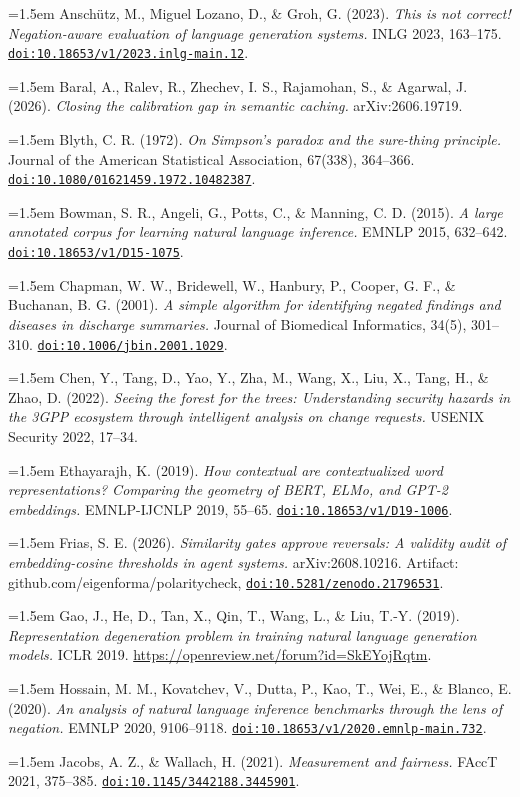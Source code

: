 \documentclass[11pt]{article}
\newcommand{\bibentry}[1]{\par\noindent\hangindent=1.5em\hangafter=1 #1\par\vspace{2pt}}
\newcommand{\doilink}[1]{\href{https://doi.org/#1}{\nolinkurl{doi:#1}}}
\begin{document}
\bibentry{\hypertarget{bib:anschutz}{}Ansch\"utz, M., Miguel Lozano, D., \& Groh, G. (2023). \emph{This is not correct! Negation-aware evaluation of language generation systems.} INLG 2023, 163--175. \doilink{10.18653/v1/2023.inlg-main.12}.}
\bibentry{\hypertarget{bib:baral}{}Baral, A., Ralev, R., Zhechev, I. S., Rajamohan, S., \& Agarwal, J. (2026). \emph{Closing the calibration gap in semantic caching.} arXiv:2606.19719.}
\bibentry{\hypertarget{bib:blyth}{}Blyth, C. R. (1972). \emph{On Simpson's paradox and the sure-thing principle.} Journal of the American Statistical Association, 67(338), 364--366. \doilink{10.1080/01621459.1972.10482387}.}
\bibentry{\hypertarget{bib:bowman}{}Bowman, S. R., Angeli, G., Potts, C., \& Manning, C. D. (2015). \emph{A large annotated corpus for learning natural language inference.} EMNLP 2015, 632--642. \doilink{10.18653/v1/D15-1075}.}
\bibentry{\hypertarget{bib:chapman}{}Chapman, W. W., Bridewell, W., Hanbury, P., Cooper, G. F., \& Buchanan, B. G. (2001). \emph{A simple algorithm for identifying negated findings and diseases in discharge summaries.} Journal of Biomedical Informatics, 34(5), 301--310. \doilink{10.1006/jbin.2001.1029}.}
\bibentry{\hypertarget{bib:chen}{}Chen, Y., Tang, D., Yao, Y., Zha, M., Wang, X., Liu, X., Tang, H., \& Zhao, D. (2022). \emph{Seeing the forest for the trees: Understanding security hazards in the 3GPP ecosystem through intelligent analysis on change requests.} USENIX Security 2022, 17--34.}
\bibentry{\hypertarget{bib:ethayarajh}{}Ethayarajh, K. (2019). \emph{How contextual are contextualized word representations? Comparing the geometry of BERT, ELMo, and GPT-2 embeddings.} EMNLP-IJCNLP 2019, 55--65. \doilink{10.18653/v1/D19-1006}.}
\bibentry{\hypertarget{bib:frias}{}Frias, S. E. (2026). \emph{Similarity gates approve reversals: A validity audit of embedding-cosine thresholds in agent systems.} arXiv:2608.10216. Artifact: github.com/eigenforma/polaritycheck, \doilink{10.5281/zenodo.21796531}.}
\bibentry{\hypertarget{bib:gao}{}Gao, J., He, D., Tan, X., Qin, T., Wang, L., \& Liu, T.-Y. (2019). \emph{Representation degeneration problem in training natural language generation models.} ICLR 2019. \url{https://openreview.net/forum?id=SkEYojRqtm}.}
\bibentry{\hypertarget{bib:hossain}{}Hossain, M. M., Kovatchev, V., Dutta, P., Kao, T., Wei, E., \& Blanco, E. (2020). \emph{An analysis of natural language inference benchmarks through the lens of negation.} EMNLP 2020, 9106--9118. \doilink{10.18653/v1/2020.emnlp-main.732}.}
\bibentry{\hypertarget{bib:jacobs}{}Jacobs, A. Z., \& Wallach, H. (2021). \emph{Measurement and fairness.} FAccT 2021, 375--385. \doilink{10.1145/3442188.3445901}.}
\end{document}
